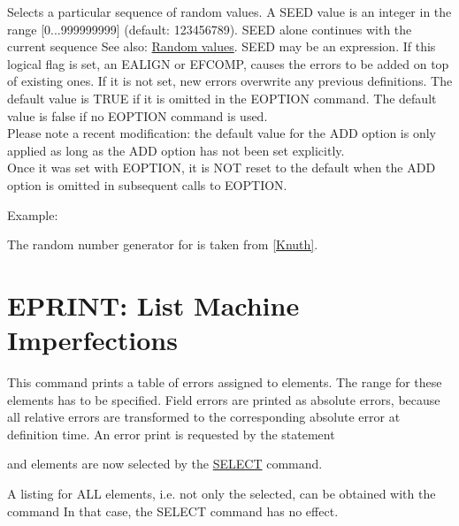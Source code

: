 \begin{madlist}
   Selects a particular sequence of random values. A SEED
  value is an integer in the range [0...999999999] (default:
  123456789). SEED alone continues with the current sequence See
  also: \href{../Introduction/expression.html#random}{Random
    values}. SEED may be an expression.  
   If this logical flag is set, an EALIGN or EFCOMP, causes
  the errors to be added on top of existing ones. If it is not set,
  new errors overwrite any previous definitions. The default value is
  TRUE if it is omitted in the EOPTION command. The default value is
  false if no EOPTION command is used.  
  \\Please note a recent modification: the default value for the ADD
  option is only applied as long as the ADD option has not been set
  explicitly. 
  \\Once it was set with EOPTION, it is NOT reset to the default when
  the ADD option is omitted in subsequent calls to EOPTION.  
\end{madlist}

Example: 

The random number generator for \madx is taken from
\href{../Introduction/bibliography.html#knuth}{[Knuth]}. 


%

\section{EPRINT: List Machine Imperfections}  
\label{sec:eprint}
This command prints a table of errors assigned to elements. The range
for these elements has to be specified. Field errors are printed as
absolute errors, because all relative errors are transformed to the
corresponding absolute error at definition time. An error print is
requested by the statement  

and elements are now selected by the
\href{../Introduction/select.html}{SELECT} command.  

A listing for ALL elements, i.e. not only the selected, can be obtained
with the command  
In that case, the SELECT command has no effect.


